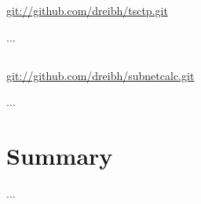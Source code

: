 \url{git://github.com/dreibh/tsctp.git}

...

\subsection{}

\url{git://github.com/dreibh/subnetcalc.git}

...


\section{Summary}

...

